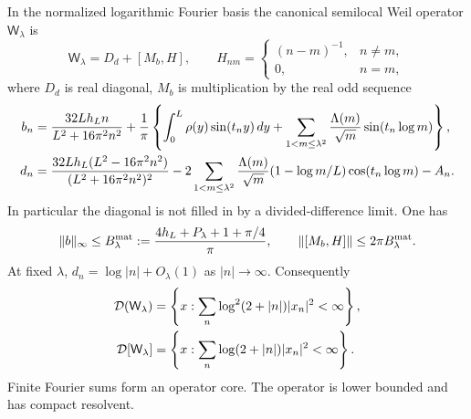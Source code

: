 \begin{proposition}
\label{prop:v114-weil-core}
In the normalized logarithmic Fourier basis the canonical semilocal
Weil operator $\mathsf W_\lambda$ is
\begin{equation}\label{eq:v114-weil-decomposition}
 \mathsf W_\lambda=D_d+[M_b,H],\qquad
 H_{nm}=\begin{cases}(n-m)^{-1},&n\ne m,\\0,&n=m,\end{cases}
\end{equation}
where $D_d$ is real diagonal, $M_b$ is multiplication by the real odd
sequence
\begin{align}
 b_n={}&\frac{32Lh_Ln}{L^2+16\pi^2n^2}
 +\frac1\pi\left\{\int_0^L\rho(y)\sin(t_ny)\,dy
 +\sum_{1<m\le\lambda^2}\frac{\Lambda(m)}{\sqrt m}
                         \sin(t_n\log m)\right\},\notag\\
 d_n={}&\frac{32Lh_L(L^2-16\pi^2n^2)}{(L^2+16\pi^2n^2)^2}
 -2\sum_{1<m\le\lambda^2}\frac{\Lambda(m)}{\sqrt m}
        (1-\log m/L)\cos(t_n\log m)-A_n.
 \label{eq:v114-b-d}
\end{align}
In particular the diagonal is not filled in by a divided-difference limit.
One has
\begin{equation}\label{eq:v114-b-bound}
 \|b\|_\infty\le B_\lambda^{\rm mat}
 :=\frac{4h_L+P_\lambda+1+\pi/4}{\pi},\qquad
 \|[M_b,H]\|\le2\pi B_\lambda^{\rm mat}.
\end{equation}
At fixed $\lambda$, $d_n=\log|n|+O_\lambda(1)$ as $|n|\to\infty$.
Consequently
\begin{align}
 \mathcal D(\mathsf W_\lambda)
 &=\left\{x:\sum_n\log^2(2+|n|)|x_n|^2<\infty\right\},\notag\\
 \mathcal D[\mathsf W_\lambda]
 &=\left\{x:\sum_n\log(2+|n|)|x_n|^2<\infty\right\}.
 \label{eq:v114-weil-domains}
\end{align}
Finite Fourier sums form an operator core. The operator is lower bounded
and has compact resolvent.
\end{proposition}
